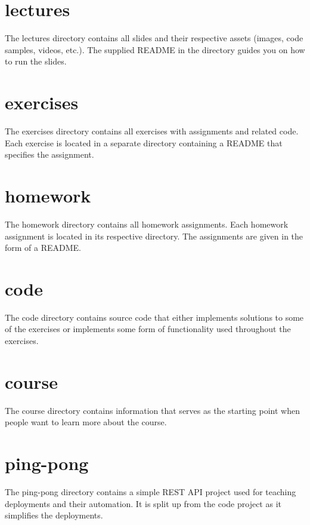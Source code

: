 \documentclass[
  digital,
  color,
  oneside,
  nosansbold,
  nocolorbold,
  lof,
  lot,
]{fithesis4}
\begin{document}
\section{lectures}

The lectures directory contains all slides and their respective assets (images, code samples, videos, etc.). The supplied README in the directory guides you on how to run the slides.

\section{exercises}

The exercises directory contains all exercises with assignments and related code. Each exercise is located in a separate directory containing a README that specifies the assignment.

\section{homework}

The homework directory contains all homework assignments. Each homework assignment is located in its respective directory. The assignments are given in the form of a README.

\section{code}

The code directory contains source code that either implements solutions to some of the exercises or implements some form of functionality used throughout the exercises.
\section{course}

The course directory contains information that serves as the starting point when people want to learn more about the course.
\section{ping-pong}

The ping-pong directory contains a simple REST API project used for teaching deployments and their automation. It is split up from the code project as it simplifies the deployments.
\end{document}
